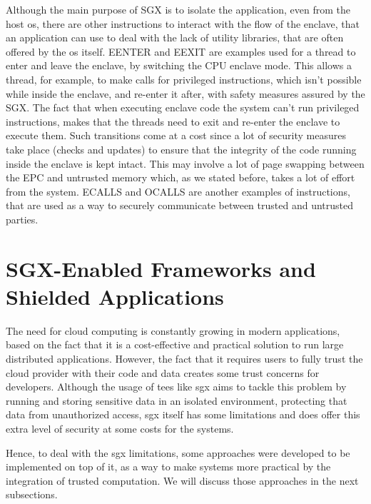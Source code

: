 Although the main purpose of SGX is to isolate the application, even from the host \gls{os}, there are other instructions to interact with the flow of the enclave, that an application can use to deal with the lack of utility libraries, that are often offered by the \gls{os} itself.
EENTER and EEXIT are examples used for a thread to enter and leave the enclave, by switching the CPU enclave mode. This allows a thread, for example, to make calls for privileged instructions, which isn't possible while inside the enclave, and re-enter it after, with safety measures assured by the SGX. The fact that when executing enclave code the system can't run privileged instructions, makes that the threads need to exit and re-enter the enclave to execute them. Such transitions come at a cost since a lot of security measures take place (checks and updates) to ensure that the integrity of the code running inside the enclave is kept intact. This may involve a lot of page swapping between the EPC and untrusted memory which, as we stated before, takes a lot of effort from the system.
ECALLS and OCALLS are another examples of instructions, that are used as a way to securely communicate between trusted and untrusted parties. 




\section{SGX-Enabled Frameworks and Shielded Applications}
\label{sec:sgxFrameworks}
The need for cloud computing is constantly growing in modern applications, based on the fact that it is a cost-effective and practical solution to run large distributed applications. However, the fact that it requires users to fully trust the cloud provider with their code and data creates some trust concerns for developers.
Although the usage of \gls{tee}s like \gls{sgx} aims to tackle this problem by running and storing sensitive data in an isolated environment, protecting that data from unauthorized access, \gls{sgx} itself has some limitations and does offer this extra level of security at some costs for the systems. 

Hence, to deal with the \gls{sgx} limitations, some approaches were developed to be implemented on top of it, as a way to make systems more practical by the integration of trusted computation. 
We will discuss those approaches in the next subsections.



